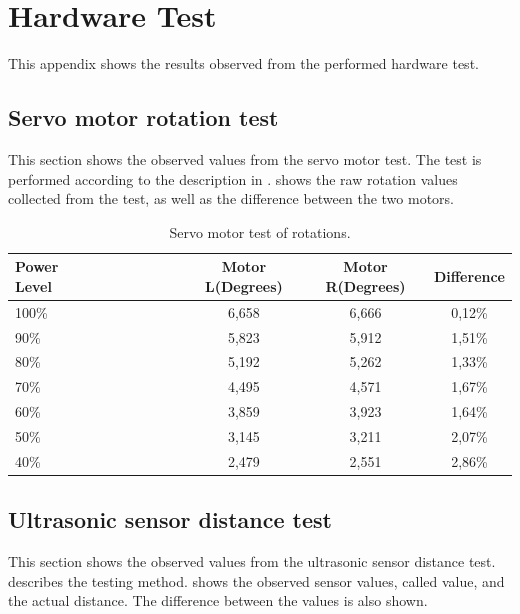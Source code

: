 \chapter{Hardware Test} \label{app:hardware_test}
This appendix shows the results observed from the performed hardware test.

\section*{Servo motor rotation test} \label{app:servo_motor_test}
This section shows the observed values from the servo motor test. The test is performed according to the description in .  shows the raw rotation values collected from the test, as well as the difference between the two motors. 

\begin{table}[H]
	\centering
    \begin{tabular}{lccc}
    \hline  
    \rowcolor{DGray}
    \textbf{Power Level}~~~~~~~~~~~~ & Motor L(Degrees) & Motor R(Degrees) & Difference \\ \hline 
    100\%                  & 6,658                  & 6,666                & 0,12\% \\
    90\%                   & 5,823                  & 5,912                & 1,51\% \\
    80\%                   & 5,192                  & 5,262                & 1,33\% \\
    70\%                   & 4,495                  & 4,571                & 1,67\% \\
    60\%                   & 3,859                  & 3,923                & 1,64\% \\
    50\%                   & 3,145                  & 3,211                & 2,07\% \\
    40\%                   & 2,479                  & 2,551                & 2,86\% \\
    \hline  
    \end{tabular}
    \caption{\label{table:app_motor_test}Servo motor test of rotations.}
\end{table}

\newpage
\section*{Ultrasonic sensor distance test} \label{app:ultrasonic_sensor_test}
This section shows the observed values from the ultrasonic sensor distance test.  describes the testing method.  shows the observed sensor values, called value, and the actual distance. The difference between the values is also shown. 

